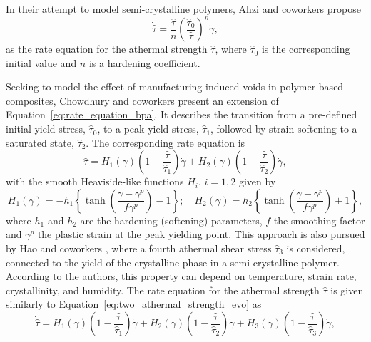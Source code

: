 In their attempt to model semi-crystalline polymers, Ahzi and coworkers \citep{ahziModelingDeformationBehavior2003} propose
\begin{equation}
  \label{eq:rate_equation_power}
  \dot{\hat \tau} =  \frac{\hat \tau}{n}\left(\frac{\hat\tau_0}{\hat\tau}\right)^n\dot \gamma,
\end{equation}
as the rate equation for the athermal strength $\hat\tau$, where $\hat\tau_0$ is the corresponding initial value and $n$ is a hardening coefficient.

Seeking to model the effect of manufacturing-induced voids in polymer-based composites, Chowdhury and coworkers \citep{chowdhuryEffectsManufacturingInducedVoids2008} present an extension of Equation~\eqref{eq:rate_equation_bpa}.
It describes the transition from a pre-defined initial yield stress, $\hat\tau_0$, to a peak yield stress, $\hat\tau_1$, followed by strain softening to a saturated state, $\hat\tau_2$.
The corresponding rate equation is
\begin{equation}
	\label{eq:two_athermal_strength_evo}
	\dot{\hat\tau}=H_1(\gamma)\left(1-\frac{\hat\tau}{\hat\tau_1}\right) \dot{\gamma}+H_2(\gamma)\left(1-\frac{\hat\tau}{\hat\tau_2}\right)\dot{\gamma},
\end{equation}
with the smooth Heaviside-like functions $H_i$, $i=1,2$ given by
\begin{equation}
	H_1(\gamma)=-h_1\left\{\tanh \left(\frac{\gamma-\gamma^p}{f \gamma^p}\right)-1\right\} ; \quad H_2(\gamma)=h_2\left\{\tanh \left(\frac{\gamma-\gamma^p}{f \gamma^p}\right)+1\right\},
\end{equation}
where $h_1$ and $h_2$ are the hardening (softening) parameters, $f$ the smoothing factor and $\gamma^p$ the plastic strain at the peak yielding point.
This approach is also pursued by Hao and coworkers \citep{haoUnifiedAmorphousCrystalline2022}, where a fourth athermal shear stress $\hat \tau_3$ is considered, connected to the yield of the crystalline phase in a semi-crystalline polymer.
According to the authors, this property can depend on temperature, strain rate, crystallinity, and humidity.
The rate equation for the athermal strength $\hat\tau$ is given similarly to Equation~\eqref{eq:two_athermal_strength_evo} as
\begin{equation}
  \label{eq:rate_equation_hao}
	\dot{\hat\tau}=H_1(\gamma) \left(1-\frac{\hat\tau}{\hat\tau_1}\right)  \dot{\gamma}+H_2(\gamma) \left(1-\frac{\hat\tau}{\hat\tau_2}\right)  \dot{\gamma}+H_3(\gamma) \left(1-\frac{\hat\tau}{\hat\tau_3}\right)  \dot{\gamma},
\end{equation}
